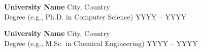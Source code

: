 \vspace{2mm}

\textbf{{{ University Name }}} \hfill {{{ City, Country }}} \\
{{{ Degree (e.g., Ph.D. in Computer Science) }}} \hfill {{{ YYYY -- YYYY }}} \\
\vspace{2mm}

\textbf{{{ University Name }}} \hfill {{{ City, Country }}} \\
{{{ Degree (e.g., M.Sc. in Chemical Engineering) }}} \hfill {{{ YYYY -- YYYY }}} \\
\vspace{2mm}
